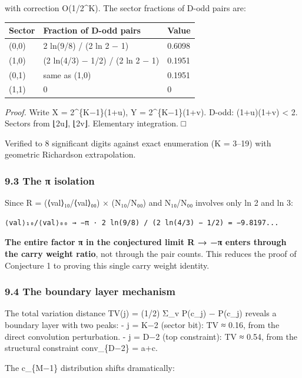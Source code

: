 \documentclass[
  11pt,
]{article}
\begin{document}
with correction O(1/2\^{}K). The sector fractions of D-odd pairs are:

\begin{longtable}[]{@{}lll@{}}
\toprule\noalign{}
Sector & Fraction of D-odd pairs & Value \\
\midrule\noalign{}
\endhead
\bottomrule\noalign{}
\endlastfoot
(0,0) & 2 ln(9/8) / (2 ln 2 − 1) & 0.6098 \\
(1,0) & (2 ln(4/3) − 1/2) / (2 ln 2 − 1) & 0.1951 \\
(0,1) & same as (1,0) & 0.1951 \\
(1,1) & 0 & 0 \\
\end{longtable}

\emph{Proof.} Write X = 2\^{}\{K−1\}(1+u), Y = 2\^{}\{K−1\}(1+v). D-odd:
(1+u)(1+v) \textless{} 2. Sectors from ⌊2u⌋, ⌊2v⌋. Elementary integration. □

Verified to 8 significant digits against exact enumeration (K = 3--19) with
geometric Richardson extrapolation.

\subsubsection{9.3 The π isolation}\label{the-ux3c0-isolation}

Since R = (⟨val⟩₁₀/⟨val⟩₀₀) × (N₁₀/N₀₀) and N₁₀/N₀₀ involves only ln 2 and ln 3:

\begin{verbatim}
⟨val⟩₁₀/⟨val⟩₀₀ → −π · 2 ln(9/8) / (2 ln(4/3) − 1/2) = −9.8197...
\end{verbatim}

\textbf{The entire factor π in the conjectured limit R → −π enters through the
carry weight ratio}, not through the pair counts. This reduces the proof of
Conjecture 1 to proving this single carry weight identity.

\subsubsection{9.4 The boundary layer
mechanism}\label{the-boundary-layer-mechanism}

The total variation distance TV(j) = (1/2) Σ\_v \textbar P(c\_j) −
P(c\_j)\textbar{} reveals a boundary layer with two peaks: - j = K−2
(sector bit): TV ≈ 0.16, from the direct convolution perturbation. - j = D−2
(top constraint): TV ≈ 0.54, from the structural constraint conv\_\{D−2\} = a+c.

The c\_\{M−1\} distribution shifts dramatically:
\end{document}
